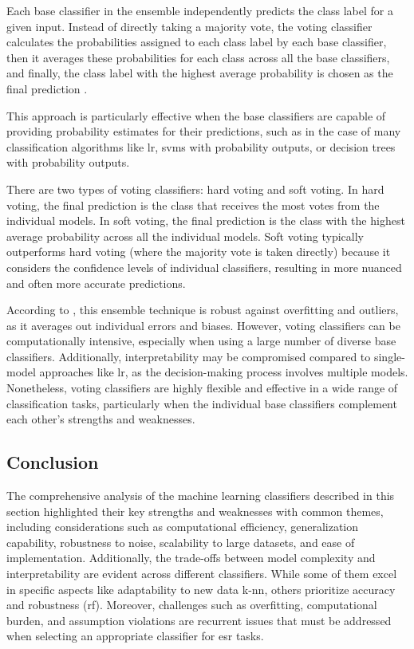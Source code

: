 Each base classifier in the ensemble independently predicts the class label for a given input. Instead of directly taking a majority vote, the voting classifier calculates the probabilities assigned to each class label by each base classifier, then it averages these probabilities for each class across all the base classifiers, and finally, the class label with the highest average probability is chosen as the final prediction \cite{Sarkar2019}.

This approach is particularly effective when the base classifiers are capable of providing probability estimates for their predictions, such as in the case of many classification algorithms like \gls{lr}, \gls{svm}s with probability outputs, or decision trees with probability outputs.

There are two types of voting classifiers: hard voting and soft voting. In hard voting, the final prediction is the class that receives the most votes from the individual models. In soft voting, the final prediction is the class with the highest average probability across all the individual models. Soft voting typically outperforms hard voting (where the majority vote is taken directly) because it considers the confidence levels of individual classifiers, resulting in more nuanced and often more accurate predictions.

According to \textcite{Sarkar2019}, this ensemble technique is robust against overfitting and outliers, as it averages out individual errors and biases. However, voting classifiers can be computationally intensive, especially when using a large number of diverse base classifiers. Additionally, interpretability may be compromised compared to single-model approaches like \gls{lr}, as the decision-making process involves multiple models. Nonetheless, voting classifiers are highly flexible and effective in a wide range of classification tasks, particularly when the individual base classifiers complement each other's strengths and weaknesses.


\subsection{Conclusion}
\label{subsec:machine_learning_conclusion}

The comprehensive analysis of the machine learning classifiers described in this section highlighted their key strengths and weaknesses with common themes, including considerations such as computational efficiency, generalization capability, robustness to noise, scalability to large datasets, and ease of implementation.  Additionally, the trade-offs between model complexity and interpretability are evident across different classifiers. While some of them excel in specific aspects like adaptability to new data \gls{k-nn}, others prioritize accuracy and robustness (\gls{rf}). Moreover, challenges such as overfitting, computational burden, and assumption violations are recurrent issues that must be addressed when selecting an appropriate classifier for \gls{esr} tasks. 


